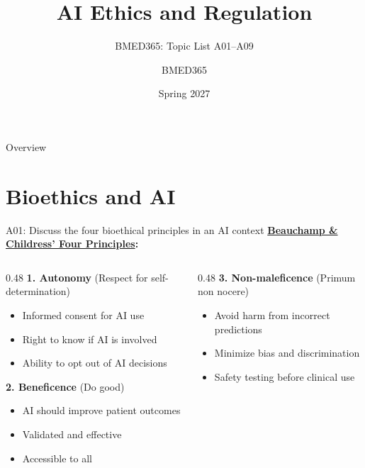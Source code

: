 \documentclass[aspectratio=169, 10pt]{beamer}
\title{AI Ethics and Regulation}
\subtitle{BMED365: Topic List A01--A09}
\author{BMED365}
\date{Spring 2027}
\begin{document}
\begin{frame}
    \titlepage
\end{frame}

\begin{frame}{Overview}
    \tableofcontents
\end{frame}

\section{Bioethics and AI}

\begin{frame}{A01: Discuss the four bioethical principles in an AI context}
    \textbf{\href{https://en.wikipedia.org/wiki/Principlism}{Beauchamp \& Childress' Four Principles}:}
    
    \vspace{0.3cm}
    \begin{columns}[T]
        \begin{column}{0.48\textwidth}
            \textbf{1. Autonomy} (Respect for self-determination)
            \begin{itemize}
                \item Informed consent for AI use
                \item Right to know if AI is involved
                \item Ability to opt out of AI decisions
            \end{itemize}
            
            \vspace{0.3cm}
            \textbf{2. Beneficence} (Do good)
            \begin{itemize}
                \item AI should improve patient outcomes
                \item Validated and effective
                \item Accessible to all
            \end{itemize}
        \end{column}
        \begin{column}{0.48\textwidth}
            \textbf{3. Non-maleficence} (Primum non nocere)
            \begin{itemize}
                \item Avoid harm from incorrect predictions
                \item Minimize bias and discrimination
                \item Safety testing before clinical use
            \end{itemize}
            

\end{column}
\end{columns}
\end{frame}
\end{document}
